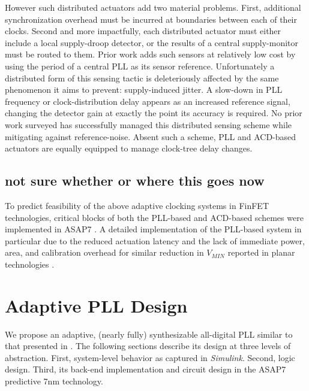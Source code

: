 \documentclass[twoside,9pt,journal,letterpage]{IEEEtran}
\begin{document}
However such distributed actuators add two material problems. First, additional synchronization overhead must be incurred at boundaries between each of their clocks. Second and more impactfully, each distributed actuator must either include a local supply-droop detector, or the results of a central supply-monitor must be routed to them. Prior work \cite{kwak2016self} adds such sensors at relatively low cost by using the period of a central PLL as its sensor reference. Unfortunately a distributed form of this sensing tactic is deleteriously affected by the same phenomenon it aims to prevent: supply-induced jitter. A slow-down in PLL frequency or clock-distribution delay appears as an increased reference signal, changing the detector gain at exactly the point its accuracy is required. No prior work surveyed has successfully managed this distributed sensing scheme while mitigating against reference-noise. Absent such a scheme, PLL and ACD-based actuators are equally equipped to manage clock-tree delay changes.

\subsection{not sure whether or where this goes now}

To predict feasibility of the above adaptive clocking systems in FinFET technologies, critical blocks of both the PLL-based \cite{hashimoto2018} and ACD-based \cite{wilcox2015} schemes were implemented in ASAP7 \cite{asap7}. A detailed implementation of the PLL-based system in particular due to the reduced actuation latency and the lack of immediate power, area, and calibration overhead for similar reduction in $V_{MIN}$ reported in planar technologies \cite{hashimoto2018,wilcox2015}.

\section{Adaptive PLL Design}
\label{sec:pll-design}

We propose an adaptive, (nearly fully) synthesizable all-digital PLL similar to that presented in \cite{hashimoto2018}. The following sections describe its design at three levels of abstraction. First, system-level behavior as captured in \textit{Simulink}. Second, logic design. Third, its back-end implementation and circuit design in the ASAP7 predictive 7nm technology. 
\end{document}
